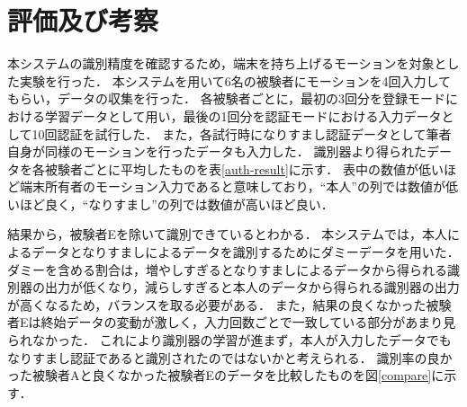 \section{評価及び考察}
本システムの識別精度を確認するため，端末を持ち上げるモーションを対象とした実験を行った．
本システムを用いて6名の被験者にモーションを4回入力してもらい，データの収集を行った．
各被験者ごとに，最初の3回分を登録モードにおける学習データとして用い，最後の1回分を認証モードにおける入力データとして10回認証を試行した．
また，各試行時になりすまし認証データとして筆者自身が同様のモーションを行ったデータも入力した．
識別器より得られたデータを各被験者ごとに平均したものを表\ref{auth-result}に示す．
表中の数値が低いほど端末所有者のモーション入力であると意味しており，``本人''の列では数値が低いほど良く，``なりすまし''の列では数値が高いほど良い．

結果から，被験者Eを除いて識別できているとわかる．
本システムでは，本人によるデータとなりすましによるデータを識別するためにダミーデータを用いた．
ダミーを含める割合は，増やしすぎるとなりすましによるデータから得られる識別器の出力が低くなり，減らしすぎると本人のデータから得られる識別器の出力が高くなるため，バランスを取る必要がある．
また，結果の良くなかった被験者Eは終始データの変動が激しく，入力回数ごとで一致している部分があまり見られなかった．
これにより識別器の学習が進まず，本人が入力したデータでもなりすまし認証であると識別されたのではないかと考えられる．
識別率の良かった被験者Aと良くなかった被験者Eのデータを比較したものを図\ref{compare}に示す．

